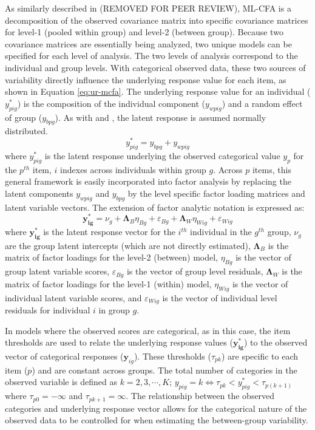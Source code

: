 \documentclass[Review,sageh,times, doublespace]{sagej}
\begin{document}
As similarly described in (REMOVED FOR PEER REVIEW), ML-CFA is a decomposition of the observed covariance matrix into specific covariance matrices for level-1 (pooled within group) and level-2 (between group). 
Because two covariance matrices are essentially being analyzed, two unique models can be specified for each level of analysis.
The two levels of analysis correspond to the individual and group levels.
With categorical observed data, these two sources of variability directly influence the underlying response value for each item, as shown in Equation \ref{eq:ur-mcfa}.
The underlying response value for an individual ($y^{*}_{pig}$) is the composition of the individual component ($y_{wpig}$) and a random effect of group ($y_{bpg}$). 
As with \cite{Muthen1984} and \cite{Asparouhov2007}, the latent response is assumed normally distributed.
\begin{equation}\label{eq:ur-mcfa}
y^{*}_{pig} = y_{bpg} + y_{wpig}
\end{equation}
where $y^{*}_{pig}$ is the latent response underlying the observed categorical value $y_p$ for the $p^{th}$ item, $i$ indexes across individuals within group $g$.
Across $p$ items, this general framework is easily incorporated into factor analysis by replacing the latent components $y_{wpig}$ and $y_{bpg}$ by the level specific factor loading matrices and latent variable vectors.
The extension of factor analytic notation is expressed as:
\begin{equation} \label{eq:mcfa}
\mathbf{y^{*}_{ig}}  = \nu_g + \mathbf{\Lambda}_{B} \eta_{Bg} +\varepsilon_{Bg} + \mathbf{\Lambda}_{W} \eta_{Wig} +\varepsilon_{Wig}
\end{equation}
where $\mathbf{y^{*}_{ig}}$ is the latent response vector for the $i^{th}$ individual in the $g^{th}$ group, $\nu_g $ are the group latent intercepts  (which are not directly estimated), $\mathbf{\Lambda}_{B}$ is the matrix of factor loadings for the level-2 (between) model, $\eta_{Bg}$ is the vector of group latent variable scores, $\varepsilon_{Bg}$ is the vector of group level residuals, $\mathbf{\Lambda}_{W}$ is the matrix of factor loadings for the level-1 (within) model, $\eta_{Wig}$ is the vector of individual latent variable scores, and $\varepsilon_{Wig}$ is the vector of individual level residuals for individual $i$ in group $g$.

In models where the observed scores are categorical, as in this case, the item thresholds are used to relate the underlying response values ($\mathbf{y^{*}_{ig}}$) to the observed vector of categorical responses ($\mathbf{y}_{ig}$).
These thresholds ($\tau_{pk}$) are specific to each item ($p$) and are constant across groups. 
The total number of categories in the observed variable is defined as $k = 2, 3, \cdots, K$; 
$y_{pig} = k \Leftrightarrow \tau_{pk} < y^{*}_{pig} < \tau_{p(k+1)}$ where $\tau_{p0} = -\infty$ and $\tau_{pk+1} = \infty$.
The relationship between the observed categories and underlying response vector allows for the categorical nature of the observed data to be controlled for when estimating the between-group variability.
\end{document}
